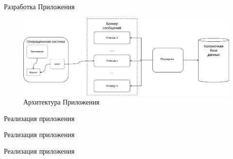 \documentclass{beamer}
\begin{document}
\begin{frame}{Разработка Приложения}
	\begin{figure}[H]
		\centering
		\begin{minipage}[t]{1.2\textwidth}
			\centering
			\includegraphics[width=.7\textwidth]{./imgs/appscheme.png}
		\end{minipage}
		\caption{Архитектура Приложения}
	\end{figure}
\end{frame}


\begin{frame}{Реализация приложения}
\end{frame}

\begin{frame}{Реализация приложения}
\end{frame}

\begin{frame}{Реализация приложения}
\end{frame}
\end{document}
